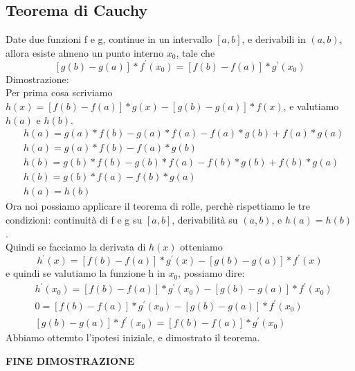 \documentclass[11pt]{article}
\begin{document}
\subsection{Teorema di Cauchy}
Date due funzioni f e g, continue in un intervallo $[a,b]$, e derivabili in $(a,b)$, allora esiste almeno un punto interno $x_{0}$, tale che 
$$[g(b)-g(a)]*f^{'}(x_{0}) = [f(b)-f(a)]*g^{'}(x_{0})$$
Dimostrazione:\\
Per prima cosa scriviamo $h(x) = [f(b)-f(a)]*g(x) - [g(b)-g(a)]*f(x)$, e valutiamo $h(a)$ e $h(b)$.\\
\begin{align*}
    &h(a) = g(a)*f(b) - g(a)*f(a) - f(a)*g(b) + f(a)*g(a)\\
    &h(a) = g(a)*f(b) - f(a)*g(b)\\
    &h(b) = g(b)*f(b) - g(b)*f(a) - f(b)*g(b) + f(b)*g(a)\\
    &h(b) = g(b)*f(a) - f(b)*g(a)\\
    &h(a) = h(b)
\end{align*}
Ora noi possiamo applicare il teorema di rolle, perchè rispettiamo le tre condizioni: continuità di f e g su $[a,b]$, derivabilità su $(a,b)$, e $h(a) = h(b)$.\\
Quindi se facciamo la derivata di $h(x)$ otteniamo $$h^{'}(x) = [f(b)-f(a)]*g^{'}(x) - [g(b)-g(a)]*f^{'}(x)$$ e quindi se valutiamo la funzione h in $x_{0}$, possiamo dire:\\
\begin{align*}
    &h^{'}(x_{0}) = [f(b)-f(a)]*g^{'}(x_{0}) - [g(b)-g(a)]*f^{'}(x_{0})\\
    &0 = [f(b)-f(a)]*g^{'}(x_{0}) - [g(b)-g(a)]*f^{'}(x_{0})\\
    &[g(b)-g(a)]*f^{'}(x_{0}) = [f(b)-f(a)]*g^{'}(x_{0})
\end{align*}
Abbiamo ottenuto l'ipotesi iniziale, e dimostrato il teorema.
\begin{center}
    \textbf{FINE DIMOSTRAZIONE}
\end{center}
\end{document}
